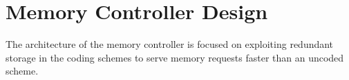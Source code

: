 \section{Memory Controller Design}
\label{sec:memcontrol}
The architecture of the memory controller is focused on exploiting redundant storage in the coding schemes to serve memory requests faster than an uncoded scheme.
